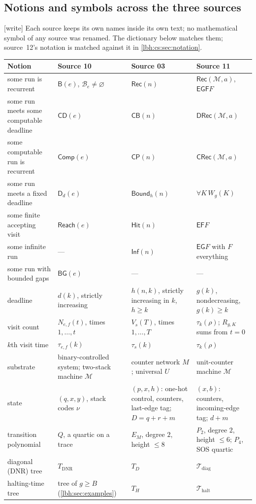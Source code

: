 \documentclass[11pt,letterpaper]{article}
\theoremstyle{definition}
\theoremstyle{remark}
\newcommand{\Buchi}{\mathsf{B}}
\newcommand{\Clock}{\mathsf{CD}}
\newcommand{\Gap}{\mathsf{BG}}
\newcommand{\Fixed}{\mathsf{D}}
\newcommand{\Reach}{\mathsf{Reach}}
\newcommand{\Comp}{\mathsf{Comp}}
\newcommand{\cB}{\mathcal B}
\newcommand{\CP}{\mathsf{CP}}
\newcommand{\CB}{\mathsf{CB}}
\newcommand{\REC}{\mathsf{Rec}}
\newcommand{\INF}{\mathsf{Inf}}
\newcommand{\HIT}{\mathsf{Hit}}
\newcommand{\BH}{\mathsf{Bound}}
\newcommand{\Rec}{\mathsf{Rec}}
\newcommand{\CRec}{\mathsf{CRec}}
\newcommand{\DRec}{\mathsf{DRec}}
\newcommand{\EF}{\mathsf{EF}}
\newcommand{\EG}{\mathsf{EG}}
\newcommand{\EGF}{\mathsf{EGF}}
\newcommand{\1}{\mathbf 1}
\newcommand{\M}{\mathcal M}
\newcommand{\T}{\mathcal T}
\newcommand{\wtag}{\textup{[write]}}%
\begin{document}
\subsection{Notions and symbols across the three sources}\label{lbh:conv:dictionary}
\wtag{} Each source keeps its own names inside its own text; no mathematical symbol of any source
was renamed. The dictionary below matches them; source~12's notation is matched against it in
\cref{lbh:cs:sec:notation}.
\begin{center}
\small
\begin{longtable}{@{}p{}p{}p{}p{}@{}}
\toprule
Notion & Source 10 & Source 03 & Source 11\\
\midrule
\endhead
some run is recurrent & $\Buchi(e)$, $\cB_e\neq\varnothing$ & $\REC(n)$ & $\Rec(\M,a)$, $\EGF F$\\
some run meets some computable deadline & $\Clock(e)$ & $\CB(n)$ & $\DRec(\M,a)$\\
some computable run is recurrent & $\Comp(e)$ & $\CP(n)$ & $\CRec(\M,a)$\\
some run meets a fixed deadline & $\Fixed_d(e)$ & $\BH_h(n)$ & $\forall K\,W_g(K)$\\
some finite accepting visit & $\Reach(e)$ & $\HIT(n)$ & $\EF F$\\
some infinite run & --- & $\INF(n)$ & $\EG F$ with $F$ everything\\
some run with bounded gaps & $\Gap(e)$ & --- & ---\\
deadline & $d(k)$, strictly increasing & $h(n,k)$, strictly increasing in $k$, $h\ge k$ & $g(k)$, nondecreasing, $g(k)\ge k$\\
visit count & $N_{e,f}(t)$, times $1,\ldots,t$ & $V_s(T)$, times $1,\ldots,T$ & $\tau_k(\rho)$; $R_{g,K}$ sums from $t=0$\\
$k$th visit time & $\tau_{e,f}(k)$ & $\tau_s(k)$ & $\tau_k(\rho)$\\
substrate & binary-controlled system; two-stack machine $\mathcal M$ & counter network $M$; universal $U$ & unit-counter machine $\M$\\
state & $(q,x,y)$, stack codes $\nu$ & $(p,x,h)$: one-hot control, counters, last-edge tag; $D=q+r+m$ & $(x,b)$: counters, incoming-edge tag; $d+m$\\
transition polynomial & $Q$, a quartic on a trace & $E_M$, degree $2$, height $\le8$ & $P_2$, degree $2$, height $\le6$; $P_4$, SOS quartic\\
diagonal (DNR) tree & $T_{\mathrm{DNR}}$ & $T_D$ & $\T_{\mathrm{diag}}$\\
halting-time tree & tree of $g\ge B$ (\cref{lbh:sec:examples}) & $T_H$ & $\T_{\mathrm{halt}}$\\
\bottomrule
\end{longtable}
\end{center}
\end{document}
